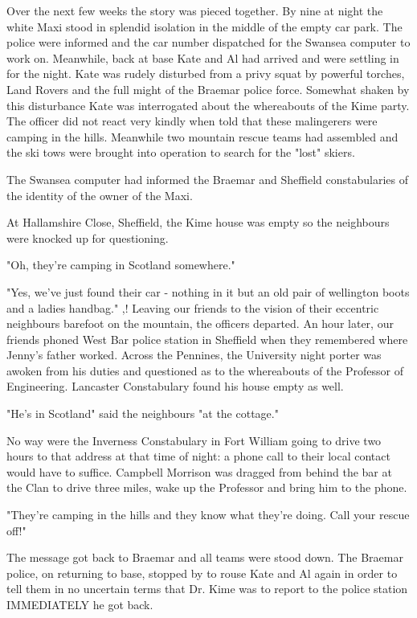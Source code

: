 \documentclass[a5paper,openany,font 10pt]{scrbook}
\begin{document}
Over the next few weeks the story was pieced together. By
nine at night the white Maxi stood in splendid isolation in the
middle of the empty car park. The police were informed and the
car number dispatched for the Swansea computer to work on.
Meanwhile, back at base Kate and Al had arrived and were settling
in for the night. Kate was rudely disturbed from a privy squat by
powerful torches, Land Rovers and the full might of the Braemar
police force. Somewhat shaken by this disturbance Kate was
interrogated about the whereabouts of the Kime party. The officer
did not react very kindly when told that these malingerers were
camping in the hills. Meanwhile two mountain rescue teams had
assembled and the ski tows were brought into operation to search
for the "lost" skiers.

The Swansea computer had informed the Braemar and Sheffield
constabularies of the identity of the owner of the Maxi.

At Hallamshire Close, Sheffield, the Kime house was empty
so the neighbours were knocked up for questioning.

"Oh, they're camping in Scotland somewhere."

"Yes, we've just found their car - nothing in it but an old
pair of wellington boots and a ladies handbag." ,!
Leaving our friends to the vision of their eccentric
neighbours barefoot on the mountain, the officers departed. An
hour later, our friends phoned West Bar police station in
Sheffield when they remembered where Jenny's father worked.
Across the Pennines, the University night porter was awoken from
his duties and questioned as to the whereabouts of the Professor
of Engineering. Lancaster Constabulary found his house empty as
well.

"He's in Scotland" said the neighbours   "at the cottage."

No way were the Inverness Constabulary in Fort William going
to drive two hours to that address at that time of night: a phone
call to their local contact would have to suffice. Campbell
Morrison was dragged from behind the bar at the Clan to drive
three miles, wake up the Professor and bring him to the phone.

"They're camping in the hills and they know what they're
doing. Call your rescue off!"

The message got back to Braemar and all teams were stood
down. The Braemar police, on returning to base, stopped by to
rouse Kate and Al again in order to tell them in no uncertain
terms that Dr. Kime was to report to the police station
IMMEDIATELY he got back.
\end{document}

